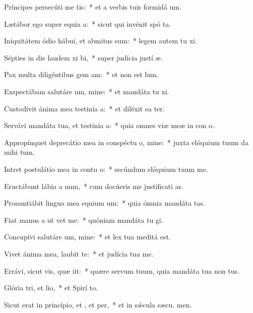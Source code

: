 \item Príncipes persecúti  me tis:~* et a verbis tuis formidá  um.
\item Lætábor ego super equia a:~* sicut qui invénit spó ta.
\item Iniquitátem ódio hábui, et abmitus sum:~* legem autem tu xi.
\item Sépties in die laudem xi bi,~* super judícia justí æ.
\item Pax multa diligéntibus gem am:~* et non est  lum.
\item Exspectábam salutáre um, mine:~* et mandáta tu xi.
\item Custodívit ánima mea testinia a:~* et diléxit ea ter.
\item Servávi mandáta tua, et testinia a:~* quia omnes viæ meæ in con o.
\item Appropínquet deprecátio mea in conspéctu o, mine:~* juxta elóquium tuum da mihi tum.
\item Intret postulátio mea in contu o:~* secúndum elóquium tuum  me.
\item Eructábunt lábia a num,~* cum docúeris me justificati as.
\item Pronuntiábit lingua mea equium um:~* quia ómnia mandáta  tas.
\item Fiat manus a ut vet me:~* quóniam mandáta tu gi.
\item Concupívi salutáre um, mine:~* et lex tua meditá  est.
\item Vivet ánima mea,  laubit te:~* et judícia tua  me.
\item Errávi, sicut vis, quæ iit:~* quære servum tuum, quia mandáta tua non  tus.
\item Glória tri, et lio,~* et Spirí to.
\item Sicut erat in princípio, et , et per,~* et in sǽcula sæcu. men.
